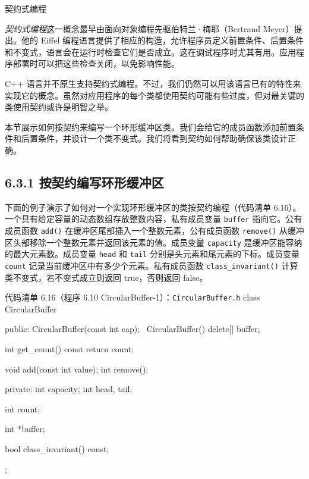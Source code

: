 \begin{mySidebar}{契约式编程}

\emph{契约式编程}这一概念最早由面向对象编程先驱伯特兰·梅耶（Bertrand Meyer）提出。他的 Eiffel 编程语言提供了相应的构造，允许程序员定义前置条件、后置条件和不变式，语言会在运行时检查它们是否成立。这在调试程序时尤其有用。应用程序部署时可以把这些检查关闭，以免影响性能。
\end{mySidebar}

C++ 语言并不原生支持契约式编程。不过，我们仍然可以用该语言已有的特性来实现它的概念。虽然对应用程序的每个类都使用契约可能有些过度，但对最关键的类使用契约或许是明智之举。


本节展示如何按契约来编写一个环形缓冲区类。我们会给它的成员函数添加前置条件和后置条件，并设计一个类不变式。我们将看到契约如何帮助确保该类设计正确。

\subsection{6.3.1 按契约编写环形缓冲区}

下面的例子演示了如何对一个实现环形缓冲区的类按契约编程（代码清单 6.16）。一个具有给定容量的动态数组存放整数内容，私有成员变量 \texttt{buffer} 指向它。公有成员函数 \texttt{add()} 在缓冲区尾部插入一个整数元素，公有成员函数 \texttt{remove()} 从缓冲区头部移除一个整数元素并返回该元素的值。成员变量 \texttt{capacity} 是缓冲区能容纳的最大元素数。成员变量 \texttt{head} 和 \texttt{tail} 分别是头元素和尾元素的下标。成员变量 \texttt{count} 记录当前缓冲区中有多少个元素。私有成员函数 \texttt{class\_\allowbreak{}invariant(\allowbreak{})\allowbreak{}} 计算类不变式，若不变式成立则返回 true，否则返回 false。

\begin{codeboxt}{代码清单 6.16（程序 6.10 CircularBuffer-1）：\texttt{Circular\allowbreak{}Buffer.\allowbreak{}h}}
class CircularBuffer
{
public:
    CircularBuffer(const int cap);
    ~CircularBuffer() { delete[] buffer; }

    int get_count() const { return count; }

    void add(const int value);
    int remove();

private:
    int capacity;
    int head, tail;

    int count;

    int *buffer;

    bool class_invariant() const;
};
\end{codeboxt}

